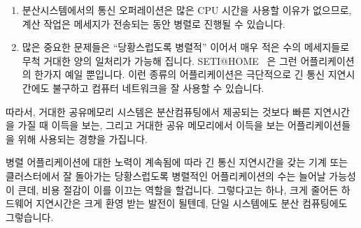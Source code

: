 {\begin{enumerate}
	\fi

	\item	분산시스템에서의 통신 오퍼레이션은 많은 CPU 시간을 사용할
		이유가 없으므로, 계산 작업은 메세지가 전송되는 동안 병렬로
		진행될 수 있습니다.
	\item	많은 중요한 문제들은 ``당황스럽도록 병렬적'' 이어서 매우 적은
		수의 메세지들로 무척 거대한 양의 일처리가 가능해 집니다.
		SETI@HOME~\cite{SETIatHOME2008}
		은 그런 어플리케이션의 한가지 예일 뿐입니다.
		이런 종류의 어플리케이션은 극단적으로 긴 통신 지연시간에도
		불구하고 컴퓨터 네트워크을 잘 사용할 수 있습니다.

	\iffalse

	\item	The distributed-systems communications operations do
		not necessarily use much CPU, so that computation can
		proceed in parallel with message transfer.
	\item	Many important problems are ``embarrassingly parallel'',
		so that extremely large quantities of processing may
		be enabled by a very small number of messages.
		SETI@HOME~\cite{SETIatHOME2008}
		was but one example of such an application.
		These sorts of applications can make good use of networks
		of computers despite extremely long communications
		latencies.

	\fi

	\end{enumerate}

	따라서, 거대한 공유메모리 시스템은 분산컴퓨팅에서 제공되는 것보다 빠른
	지연시간을 가질 때 이득을 보는, 그리고 거대한 공유 메모리에서 이득을
	보는 어플리케이션들을 위해 사용되는 경향을 가집니다.

	병렬 어플리케이션에 대한 노력이 계속됨에 따라 긴 통신 지연시간을 갖는
	기계 또는 클러스터에서 잘 돌아가는 당황스럽도록 병렬적인 어플리케이션의
	수는 늘어날 가능성이 큰데, 비용 절감이 이를 이끄는 역할을 할겁니다.
	그렇다고는 하나, 크게 줄어든 하드웨어 지연시간은 크게 환영 받는 발전이
	될텐데, 단일 시스템에도 분산 컴퓨팅에도 그렇습니다.

	\iffalse

	Thus, large shared-memory systems tend to be used for applications
	that benefit from faster latencies than can be provided by
	distributed computing, and particularly for those applications
	that benefit from a large shared memory.

	It is likely that continued work on parallel applications will
	increase the number of embarrassingly parallel applications that
	can run well on machines and/or clusters having long communications
	latencies, reductions in cost being the driving force that it is.
	That said, greatly reduced hardware latencies would be an
	extremely welcome development, both for single-system and
	for distributed computing.

	\fi

}\QuickQuizEnd

